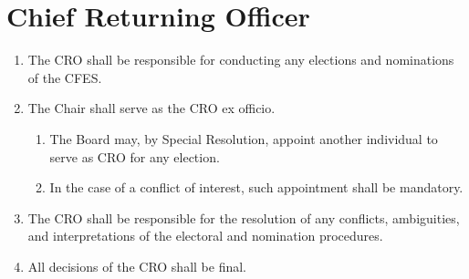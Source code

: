 \section{Chief Returning Officer}
\label{chief-returning-officer}

\begin{enumerate}
 \item The CRO shall be responsible for conducting any elections and nominations of the CFES.
 \item The Chair shall serve as the CRO ex officio.
  \begin{enumerate}
   \item The Board may, by Special Resolution, appoint another individual to serve as CRO for any election.
   \item In the case of a conflict of interest, such appointment shall be mandatory.
  \end{enumerate}
 \item The CRO shall be responsible for the resolution of any conflicts, ambiguities, and interpretations of the electoral and nomination procedures.
 \item All decisions of the CRO shall be final.
\end{enumerate}
